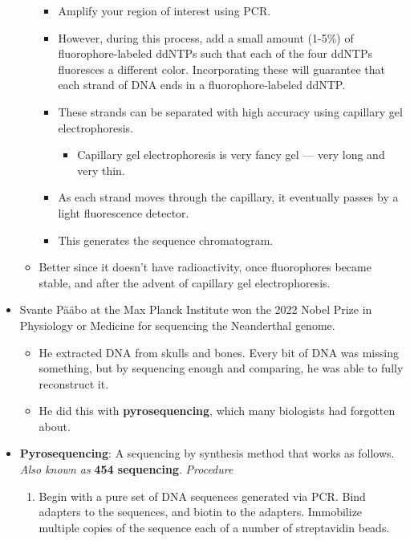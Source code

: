 \documentclass[../notes.tex]{subfiles}
\begin{document}
\begin{itemize}
\begin{itemize}
        \begin{itemize}
            \item Amplify your region of interest using PCR.
            \item However, during this process, add a small amount (1-5\%) of fluorophore-labeled ddNTPs such that each of the four ddNTPs fluoresces a different color. Incorporating these will guarantee that each strand of DNA ends in a fluorophore-labeled ddNTP.
            \item These strands can be separated with high accuracy using capillary gel electrophoresis.
            \begin{itemize}
                \item Capillary gel electrophoresis is very fancy gel --- very long and very thin.
            \end{itemize}
            \item As each strand moves through the capillary, it eventually passes by a light fluorescence detector.
            \item This generates the sequence chromatogram.
        \end{itemize}
        \item Better since it doesn't have radioactivity, once fluorophores became stable, and after the advent of capillary gel electrophoresis.
    \end{itemize}
    \item Svante P\"{a}\"{a}bo at the Max Planck Institute won the 2022 Nobel Prize in Physiology or Medicine for sequencing the Neanderthal genome.
    \begin{itemize}
        \item He extracted DNA from skulls and bones. Every bit of DNA was missing something, but by sequencing enough and comparing, he was able to fully reconstruct it.
        \item He did this with \textbf{pyrosequencing}, which many biologists had forgotten about.
    \end{itemize}
    \item \textbf{Pyrosequencing}: A sequencing by synthesis method that works as follows. \emph{Also known as} \textbf{454 sequencing}. \emph{Procedure}
    \begin{enumerate}
        \item Begin with a pure set of DNA sequences generated via PCR. Bind adapters to the sequences, and biotin to the adapters. Immobilize multiple copies of the sequence each of a number of streptavidin beads.

\end{enumerate}
\end{itemize}
\end{document}
